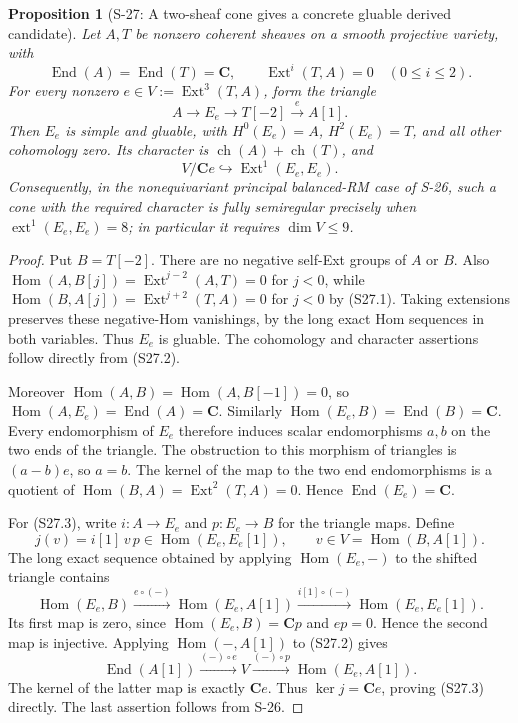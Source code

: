 \documentclass[11pt,a4paper]{article}
\newtheorem{proposition}[theorem]{Proposition}
\theoremstyle{definition}
\begin{document}
\begin{proposition}[S-27: A two-sheaf cone gives a concrete gluable derived candidate]
\label{prop:semireg-two-sheaf-cone}
Let $A,T$ be nonzero coherent sheaves on a smooth projective
variety, with
\[
 \operatorname{End}(A)=\operatorname{End}(T)=\mathbf C,
 \qquad \operatorname{Ext}^i(T,A)=0\quad(0\le i\le2).
 \tag{S27.1}
\]
For every nonzero $e\in V:=\operatorname{Ext}^3(T,A)$,
form the triangle
\[
 A\longrightarrow E_e\longrightarrow T[-2]
       \xrightarrow{e}A[1].
 \tag{S27.2}
\]
Then $E_e$ is simple and gluable, with
$H^0(E_e)=A$, $H^2(E_e)=T$, and all other cohomology zero.
Its character is $\operatorname{ch}(A)+\operatorname{ch}(T)$,
and
\[
 V/\mathbf C e\hookrightarrow
       \operatorname{Ext}^1(E_e,E_e).
 \tag{S27.3}
\]
Consequently, in the nonequivariant principal balanced-RM
case of S-26, such a cone with the required character is
fully semiregular precisely when
$\operatorname{ext}^1(E_e,E_e)=8$; in particular it requires
$\dim V\le9$.
\end{proposition}
\begin{proof}
Put $B=T[-2]$. There are no negative self-Ext groups of
$A$ or $B$. Also
$\operatorname{Hom}(A,B[j])=\operatorname{Ext}^{j-2}(A,T)=0$
for $j<0$, while
$\operatorname{Hom}(B,A[j])=\operatorname{Ext}^{j+2}(T,A)=0$
for $j<0$ by (S27.1). Taking extensions preserves these
negative-Hom vanishings, by the long exact Hom sequences
in both variables. Thus $E_e$ is gluable. The cohomology
and character assertions follow directly from (S27.2).

Moreover $\operatorname{Hom}(A,B)=
\operatorname{Hom}(A,B[-1])=0$, so
$\operatorname{Hom}(A,E_e)=\operatorname{End}(A)=\mathbf C$.
Similarly $\operatorname{Hom}(E_e,B)=\operatorname{End}(B)
=\mathbf C$. Every endomorphism of $E_e$ therefore induces
scalar endomorphisms $a,b$ on the two ends of the triangle.
The obstruction to this morphism of triangles is
$(a-b)e$, so $a=b$. The kernel of the map to the two
end endomorphisms is a quotient of
$\operatorname{Hom}(B,A)=\operatorname{Ext}^2(T,A)=0$.
Hence $\operatorname{End}(E_e)=\mathbf C$.

For (S27.3), write $i:A\to E_e$ and $p:E_e\to B$
for the triangle maps. Define
\[
 j(v)=i[1]\,v\,p\in\operatorname{Hom}(E_e,E_e[1]),
 \qquad v\in V=\operatorname{Hom}(B,A[1]).
\]
The long exact sequence obtained by applying
$\operatorname{Hom}(E_e,-)$ to the shifted triangle
contains
\[
 \operatorname{Hom}(E_e,B)\xrightarrow{e\circ(-)}
 \operatorname{Hom}(E_e,A[1])\xrightarrow{i[1]\circ(-)}
 \operatorname{Hom}(E_e,E_e[1]).
\]
Its first map is zero, since $\operatorname{Hom}(E_e,B)=
\mathbf C p$ and $ep=0$. Hence the second map is injective.
Applying $\operatorname{Hom}(-,A[1])$ to (S27.2) gives
\[
 \operatorname{End}(A[1])\xrightarrow{(-)\circ e}
 V\xrightarrow{(-)\circ p}\operatorname{Hom}(E_e,A[1]).
\]
The kernel of the latter map is exactly $\mathbf C e$.
Thus $\ker j=\mathbf C e$, proving (S27.3) directly.
The last assertion follows from S-26.
\end{proof}
\end{document}
